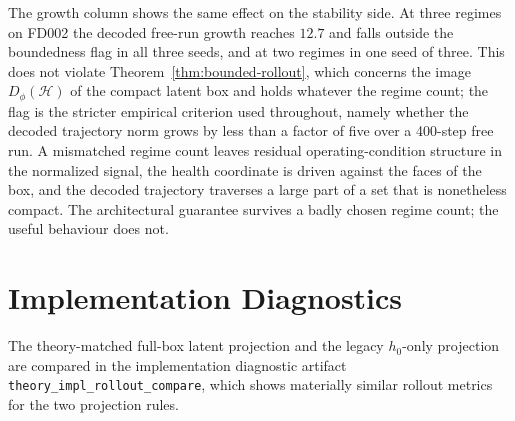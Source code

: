 \documentclass[a4paper,fleqn]{cas-sc}
\newcommand{\Hspace}{\mathcal{H}}
\begin{document}
The growth column shows the same effect on the stability side. At three regimes
on FD002 the decoded free-run growth reaches $12.7$ and falls outside the
boundedness flag in all three seeds, and at two regimes in one seed of three.
This does not violate Theorem~\ref{thm:bounded-rollout}, which concerns the
image $D_\phi(\Hspace)$ of the compact latent box and holds whatever the regime
count; the flag is the stricter empirical criterion used throughout, namely
whether the decoded trajectory norm grows by less than a factor of five over a
400-step free run. A mismatched regime count leaves residual
operating-condition structure in the normalized signal, the health coordinate
is driven against the faces of the box, and the decoded trajectory traverses a
large part of a set that is nonetheless compact. The architectural guarantee
survives a badly chosen regime count; the useful behaviour does not.

\section{Implementation Diagnostics}

The theory-matched full-box latent projection and the legacy $h_0$-only
projection are compared in the implementation diagnostic artifact
\texttt{theory\_impl\_rollout\_compare}, which shows materially similar rollout
metrics for the two projection rules.
\end{document}
